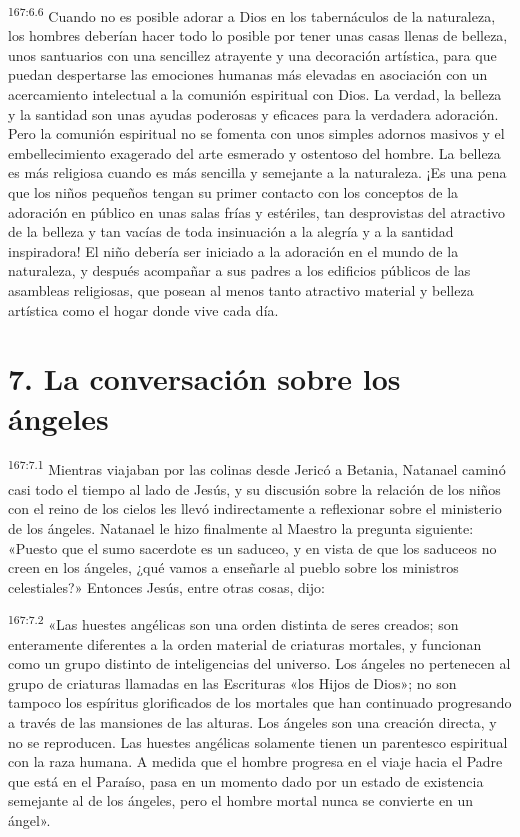 \par 
\textsuperscript{167:6.6} Cuando no es posible adorar a Dios en los tabernáculos de la naturaleza, los hombres deberían hacer todo lo posible por tener unas casas llenas de belleza, unos santuarios con una sencillez atrayente y una decoración artística, para que puedan despertarse las emociones humanas más elevadas en asociación con un acercamiento intelectual a la comunión espiritual con Dios. La verdad, la belleza y la santidad son unas ayudas poderosas y eficaces para la verdadera adoración. Pero la comunión espiritual no se fomenta con unos simples adornos masivos y el embellecimiento exagerado del arte esmerado y ostentoso del hombre. La belleza es más religiosa cuando es más sencilla y semejante a la naturaleza. ¡Es una pena que los niños pequeños tengan su primer contacto con los conceptos de la adoración en público en unas salas frías y estériles, tan desprovistas del atractivo de la belleza y tan vacías de toda insinuación a la alegría y a la santidad inspiradora! El niño debería ser iniciado a la adoración en el mundo de la naturaleza, y después acompañar a sus padres a los edificios públicos de las asambleas religiosas, que posean al menos tanto atractivo material y belleza artística como el hogar donde vive cada día.

\section*{7. La conversación sobre los ángeles}
\par 
\textsuperscript{167:7.1} Mientras viajaban por las colinas desde Jericó a Betania, Natanael caminó casi todo el tiempo al lado de Jesús, y su discusión sobre la relación de los niños con el reino de los cielos les llevó indirectamente a reflexionar sobre el ministerio de los ángeles. Natanael le hizo finalmente al Maestro la pregunta siguiente: «Puesto que el sumo sacerdote es un saduceo, y en vista de que los saduceos no creen en los ángeles, ¿qué vamos a enseñarle al pueblo sobre los ministros celestiales?» Entonces Jesús, entre otras cosas, dijo:

\par 
\textsuperscript{167:7.2} «Las huestes angélicas son una orden distinta de seres creados; son enteramente diferentes a la orden material de criaturas mortales, y funcionan como un grupo distinto de inteligencias del universo. Los ángeles no pertenecen al grupo de criaturas llamadas en las Escrituras «los Hijos de Dios»; no son tampoco los espíritus glorificados de los mortales que han continuado progresando a través de las mansiones de las alturas. Los ángeles son una creación directa, y no se reproducen. Las huestes angélicas solamente tienen un parentesco espiritual con la raza humana. A medida que el hombre progresa en el viaje hacia el Padre que está en el Paraíso, pasa en un momento dado por un estado de existencia semejante al de los ángeles, pero el hombre mortal nunca se convierte en un ángel».

